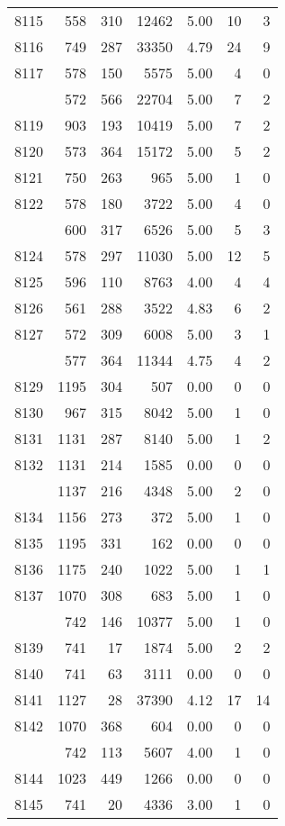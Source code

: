 \documentclass[
]{article}
\begin{document}
\begin{table}
\begin{tabular}[t]{lrrrrrr}
8115 & 558 & 310 & 12462 & 5.00 & 10 & 3\\
8116 & 749 & 287 & 33350 & 4.79 & 24 & 9\\
8117 & 578 & 150 & 5575 & 5.00 & 4 & 0\\
\addlinespace
8118 & 572 & 566 & 22704 & 5.00 & 7 & 2\\
8119 & 903 & 193 & 10419 & 5.00 & 7 & 2\\
8120 & 573 & 364 & 15172 & 5.00 & 5 & 2\\
8121 & 750 & 263 & 965 & 5.00 & 1 & 0\\
8122 & 578 & 180 & 3722 & 5.00 & 4 & 0\\
\addlinespace
8123 & 600 & 317 & 6526 & 5.00 & 5 & 3\\
8124 & 578 & 297 & 11030 & 5.00 & 12 & 5\\
8125 & 596 & 110 & 8763 & 4.00 & 4 & 4\\
8126 & 561 & 288 & 3522 & 4.83 & 6 & 2\\
8127 & 572 & 309 & 6008 & 5.00 & 3 & 1\\
\addlinespace
8128 & 577 & 364 & 11344 & 4.75 & 4 & 2\\
8129 & 1195 & 304 & 507 & 0.00 & 0 & 0\\
8130 & 967 & 315 & 8042 & 5.00 & 1 & 0\\
8131 & 1131 & 287 & 8140 & 5.00 & 1 & 2\\
8132 & 1131 & 214 & 1585 & 0.00 & 0 & 0\\
\addlinespace
8133 & 1137 & 216 & 4348 & 5.00 & 2 & 0\\
8134 & 1156 & 273 & 372 & 5.00 & 1 & 0\\
8135 & 1195 & 331 & 162 & 0.00 & 0 & 0\\
8136 & 1175 & 240 & 1022 & 5.00 & 1 & 1\\
8137 & 1070 & 308 & 683 & 5.00 & 1 & 0\\
\addlinespace
8138 & 742 & 146 & 10377 & 5.00 & 1 & 0\\
8139 & 741 & 17 & 1874 & 5.00 & 2 & 2\\
8140 & 741 & 63 & 3111 & 0.00 & 0 & 0\\
8141 & 1127 & 28 & 37390 & 4.12 & 17 & 14\\
8142 & 1070 & 368 & 604 & 0.00 & 0 & 0\\
\addlinespace
8143 & 742 & 113 & 5607 & 4.00 & 1 & 0\\
8144 & 1023 & 449 & 1266 & 0.00 & 0 & 0\\
8145 & 741 & 20 & 4336 & 3.00 & 1 & 0\\

\end{tabular}
\end{table}
\end{document}
